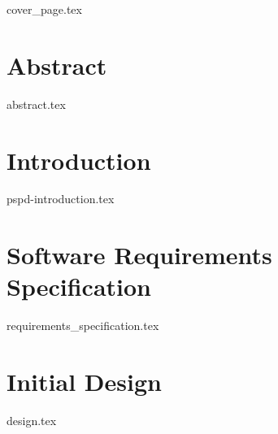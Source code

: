 \documentclass[a4paper, 12pt, oneside]{book}
\begin{document}
\frontmatter
{cover_page.tex}


{  %

\tableofcontents

{\let\clearpage\relax
\listoffigures}
{\let\clearpage\relax
\listoftables}
{\let\clearpage\relax
\printglossary[type=\acronymtype,nonumberlist, style=super
]}
}


\chapter{Abstract}
{abstract.tex}

\mainmatter


\chapter{Introduction}
{pspd-introduction.tex}



\chapter{Software Requirements Specification}
{requirements_specification.tex}


\chapter{Initial Design}
{design.tex}
\end{document}
